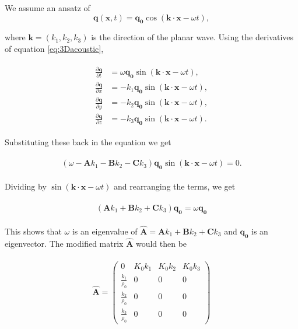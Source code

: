 We assume an ansatz of 
\begin{equation}
    \mathbf{q}\left(\mathbf{x}, t\right) = \mathbf{q_0} \cos\left(\mathbf{k}\cdot\mathbf{x} - \omega t\right),
\end{equation}

where $\mathbf{k}=\left(k_1, k_2, k_3\right)$ is the direction of the planar wave. Using the derivatives of equation \ref{eq:3Dacoustic},

\begin{align}
    \begin{split}
    \frac{\partial \mathbf{q}}{\partial t} &= \omega \mathbf{q_0} \sin\left(\mathbf{k}\cdot\mathbf{x} - \omega t\right), \\
    \frac{\partial \mathbf{q}}{\partial x} &= -k_1 \mathbf{q_0} \sin\left(\mathbf{k}\cdot\mathbf{x} - \omega t\right), \\
    \frac{\partial \mathbf{q}}{\partial y} &= -k_2 \mathbf{q_0} \sin\left(\mathbf{k}\cdot\mathbf{x} - \omega t\right), \\
    \frac{\partial \mathbf{q}}{\partial z} &= -k_3 \mathbf{q_0} \sin\left(\mathbf{k}\cdot\mathbf{x} - \omega t\right).
\end{split}
\end{align}

Substituting these back in the equation we get

\begin{align}
    \begin{split}
        \left(\omega - \mathbf{A}k_1 - \mathbf{B}k_2 - \mathbf{C}k_3\right)\mathbf{q_0}\sin\left(\mathbf{k}\cdot\mathbf{x} - \omega t\right) = 0.
    \end{split}
\end{align}

Dividing by $\sin\left(\mathbf{k}\cdot\mathbf{x} - \omega t\right)$ and rearranging the terms, we get

\begin{align}
    \begin{split}
        \left(\mathbf{A}k_1 + \mathbf{B}k_2 + \mathbf{C}k_3\right)\mathbf{q_0} = \omega \mathbf{q_0}
    \end{split}
\end{align}

This shows that $\omega$ is an eigenvalue of $\mathbf{\hat{A}} = \mathbf{A}k_1 + \mathbf{B}k_2 + \mathbf{C}k_3$ and $\mathbf{q_0}$ is an eigenvector. The modified matrix $\mathbf{\hat{A}}$ would then be

\begin{align}
    \begin{split}
    \mathbf{\hat{A}} = \left(\begin{array}{rrrr}
0 & K_{0} k_{1} & K_{0} k_{2} & K_{0} k_{3} \\
\frac{k_{1}}{\rho_{0}} & 0 & 0 & 0 \\
\frac{k_{2}}{\rho_{0}} & 0 & 0 & 0 \\
\frac{k_{3}}{\rho_{0}} & 0 & 0 & 0
\end{array}\right)
    \end{split}
\end{align}

